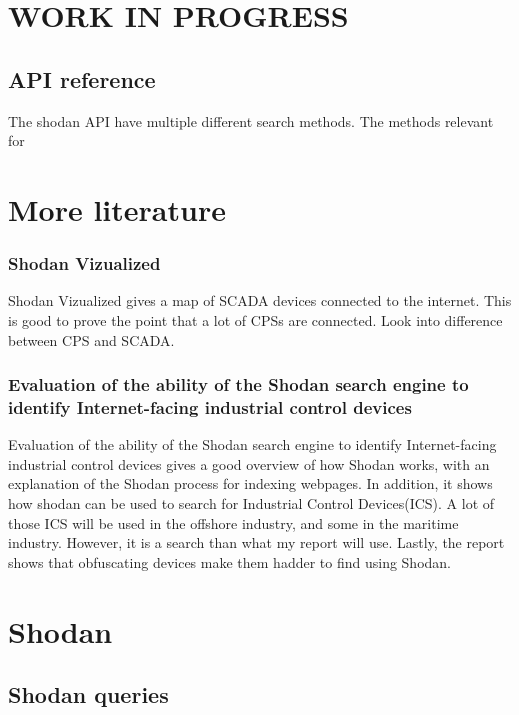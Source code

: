 \section{WORK IN PROGRESS} \label{sec:new}

\subsection{API reference}
The shodan API have multiple different search methods. The methods relevant for 

\section{More literature}
\subsubsection{Shodan Vizualized}
Shodan Vizualized gives a map of SCADA devices connected to the internet.\cite{ercolani_patton_chen_2016} This is good to prove the point that a lot of CPSs are connected. Look into difference between CPS and SCADA. 

\subsubsection{Evaluation of the ability of the Shodan search engine to identify Internet-facing industrial control devices}
Evaluation of the ability of the Shodan search engine to identify Internet-facing industrial control devices gives a good overview of how Shodan works, with an explanation of the Shodan process for indexing webpages.\cite{bodenheim_butts_dunlap_mullins_2014} In addition, it shows how shodan can be used to search for Industrial Control Devices(ICS). A lot of those ICS will be used in the offshore industry, and some in the maritime industry. However, it is a search than what my report will use.
Lastly, the report shows that obfuscating devices make them hadder to find using Shodan.

\section{Shodan}
\subsection{Shodan queries}
